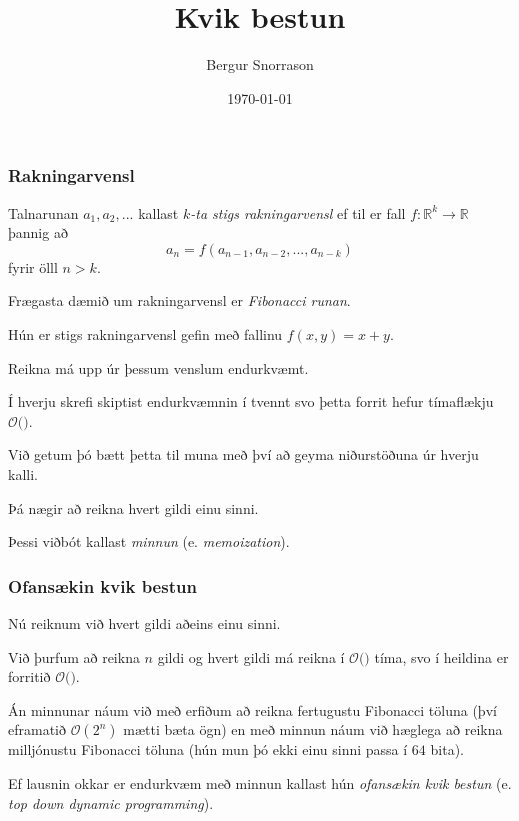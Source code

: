 \title{Kvik bestun}
\author{Bergur Snorrason}
\date{\today}



\frame{\titlepage}

{
	\frametitle{Rakningarvensl}
	{
		\item<1-> Talnarunan $a_1, a_2, ...$ kallast \emph{$k$-ta stigs rakningarvensl} ef til er fall
					$f \colon \mathbb{R}^k \rightarrow \mathbb{R}$ þannig að
					\[
						a_n = f(a_{n - 1}, a_{n - 2}, ..., a_{n - k})
					\]
					fyrir ölll $n > k$.
		\item<2-> Frægasta dæmið um rakningarvensl er \emph{Fibonacci runan}.
		\item<3-> Hún er  stigs rakningarvensl gefin með fallinu $f(x, y) = x + y$.
		\item<5-> Reikna má upp úr þessum venslum endurkvæmt.
		\item<6->[] 
	}
}

{
	{
		\item<1-> Í hverju skrefi skiptist endurkvæmnin í tvennt svo þetta forrit hefur tímaflækju $\mathcal{O}($\onslide<2->{$2^n$}$)$.
		\item<3-> Við getum þó bætt þetta til muna með því að geyma niðurstöðuna úr hverju kalli.
		\item<4-> Þá nægir að reikna hvert gildi einu sinni.
		\item<5-> Þessi viðbót kallast \emph{minnun} (e. \emph{memoization}).
	}
}

{
}

{
	\frametitle{Ofansækin kvik bestun}
	{
		\item<1-> Nú reiknum við hvert gildi aðeins einu sinni.
		\item<2-> Við þurfum að reikna $n$ gildi og hvert gildi má reikna í $\mathcal{O}($$)$ tíma, svo í heildina er forritið
					$\mathcal{O}($\onslide<4->{$\,n\,$}$)$.
		\item<5-> Án minnunar náum við með erfiðum að reikna fertugustu Fibonacci töluna (því eframatið $\mathcal{O}(2^n)$ mætti bæta ögn)
					en með minnun náum við hæglega að reikna milljónustu Fibonacci töluna (hún mun þó ekki einu sinni passa í $64$ bita).
		\item<6-> Ef lausnin okkar er endurkvæm með minnun kallast hún \emph{ofansækin kvik bestun} (e. \emph{top down dynamic programming}).
	}
}


